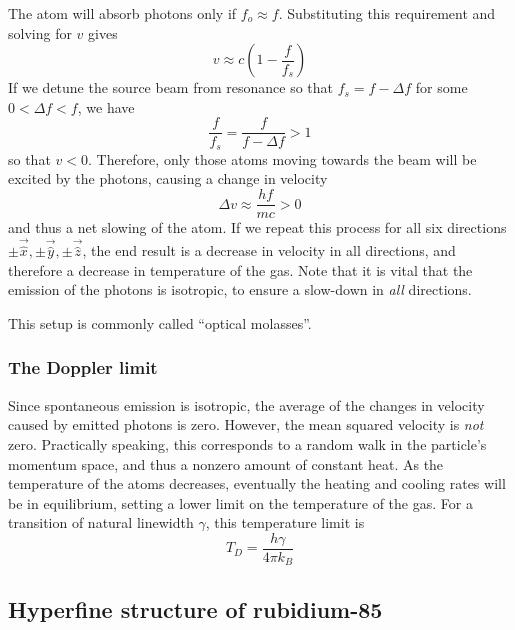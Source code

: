 \documentclass[11pt,twoside,a4paper]{article}
\begin{document}
The atom will absorb photons only if \(f_o\approx f\). Substituting this requirement and solving for \(v\) gives
\begin{equation}
    v\approx c\left(1-\frac{f}{f_s}\right)
\end{equation}
If we detune the source beam from resonance so that \(f_s=f-\Delta f\) for some \(0<\Delta f<f\), we have
\begin{equation}
    \frac{f}{f_s} = \frac{f}{f-\Delta f} > 1
\end{equation}
so that \(v<0\). Therefore, only those atoms moving towards the beam will be excited by the photons, causing a change in velocity
\begin{equation}
    \Delta v\approx\frac{hf}{mc}>0
\end{equation}
and thus a net slowing of the atom. If we repeat this process for all six directions \(\pm\vec{\hat{x}},\pm\vec{\hat{y}},\pm\vec{\hat{z}}\), the end result is a decrease in velocity in all directions, and therefore
a decrease in temperature of the gas. Note that it is vital that the emission of the photons is isotropic, to ensure a slow-down in \textit{all} directions.

This setup is commonly called ``optical molasses''.
\subsubsection{The Doppler limit}
Since spontaneous emission is isotropic, the average of the changes in velocity caused by emitted photons is zero. However, the mean squared velocity is \textit{not} zero.
Practically speaking, this corresponds to a random walk in the particle's momentum space, and thus a nonzero amount of constant heat.
As the temperature of the atoms decreases, eventually the heating and cooling rates will be in equilibrium, setting a lower limit on the temperature of the gas. For a transition of natural linewidth \(\gamma\), this temperature limit is~\cite{lett1989}
\begin{equation}
    T_D = \frac{h\gamma}{4\pi k_B}
\end{equation}
\subsection{Hyperfine structure of rubidium-85}
\end{document}

